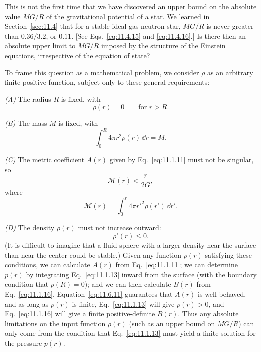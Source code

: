 This is not the first time that we have discovered an upper bound on the
absolute value \(MG/R\) of the gravitational potential of a star. We learned
in Section~\ref{sec:11.4} that for a stable ideal-gas neutron star, \(MG/R\)
is never greater than \(0.36/3.2\), or \(0.11\). [See
Eqs.~\eqref{eq:11.4.15} and \eqref{eq:11.4.16}.] Is there then an absolute
upper limit to \(MG/R\) imposed by the structure of the Einstein equations,
irrespective of the equation of state?

To frame this question as a mathematical problem, we consider \(\rho\) as an
arbitrary finite positive function, subject only to these general
requirements:

\emph{(A)} The radius \(R\) is fixed, with
\begin{equation}
  \rho(r)=0\qquad\text{for }r>R.
  \tag{11.6.9}\label{eq:11.6.9}
\end{equation}

\emph{(B)} The mass \(M\) is fixed, with
\begin{equation}
  \int_0^R4\pi r^2\rho(r)\,\dd r=M.
  \tag{11.6.10}\label{eq:11.6.10}
\end{equation}

\emph{(C)} The metric coefficient \(A(r)\) given by
Eq.~\eqref{eq:11.1.11} must not be singular, so
\begin{equation}
  \mathcal{M}(r)<\frac r{2G},
  \tag{11.6.11}\label{eq:11.6.11}
\end{equation}
where
\[
  \mathcal{M}(r)=\int_0^r4\pi r'^2\rho(r')\,\dd r'.
\]

\emph{(D)} The density \(\rho(r)\) must not increase outward:
\begin{equation}
  \rho'(r)\le0.
  \tag{11.6.12}\label{eq:11.6.12}
\end{equation}
(It is difficult to imagine that a fluid sphere with a larger density near the
surface than near the center could be stable.) Given any function \(\rho(r)\)
satisfying these conditions, we can calculate \(A(r)\) from
Eq.~\eqref{eq:11.1.11}; we can determine \(p(r)\) by integrating
Eq.~\eqref{eq:11.1.13} inward from the surface (with the boundary condition
that \(p(R)=0\)); and we can then calculate \(B(r)\) from
Eq.~\eqref{eq:11.1.16}. Equation~\eqref{eq:11.6.11} guarantees that \(A(r)\)
is well behaved, and as long as \(p(r)\) is finite,
Eq.~\eqref{eq:11.1.13} will give \(p(r)>0\), and
Eq.~\eqref{eq:11.1.16} will give a finite positive-definite \(B(r)\). Thus
any absolute limitations on the input function \(\rho(r)\) (such as an upper
bound on \(MG/R\)) can only come from the condition that
Eq.~\eqref{eq:11.1.13} must yield a finite solution for the pressure \(p(r)\).

